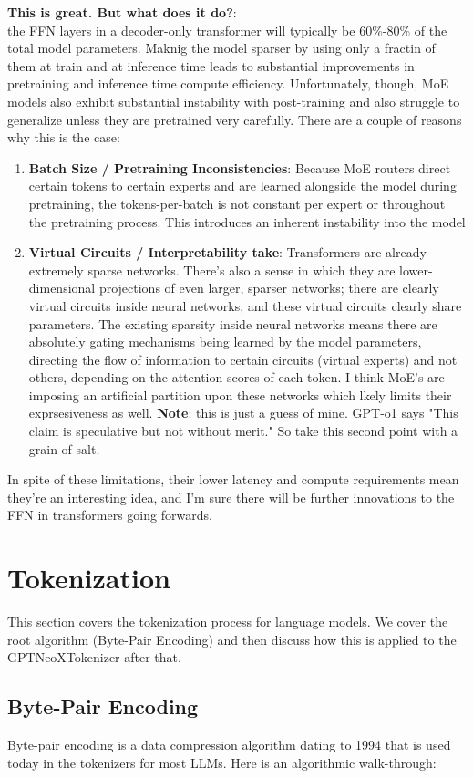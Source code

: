 \documentclass[12pt]{article}
\begin{document}
\textbf{This is great. But what does it do?}:\\
the FFN layers in a decoder-only transformer will typically be 60\%-80\% of the total model parameters. Maknig the model sparser by using only a fractin of them at train and at inference time leads to substantial improvements in pretraining and inference time compute efficiency. Unfortunately, though, MoE models also exhibit substantial instability with post-training and also struggle to generalize unless they are pretrained very carefully. There are a couple of reasons why this is the case: 
\begin{enumerate}
\item \textbf{Batch Size / Pretraining Inconsistencies}: Because MoE routers direct certain tokens to certain experts and are learned alongside the model during pretraining, the tokens-per-batch is not constant per expert or throughout the pretraining process. This introduces an inherent instability into the model
\item \textbf{Virtual Circuits / Interpretability take}: Transformers are already extremely sparse networks. There's also a sense in which they are lower-dimensional projections of even larger, sparser networks; there are clearly virtual circuits inside neural networks, and these virtual circuits clearly share parameters. The existing sparsity inside neural networks means there are absolutely gating mechanisms being learned by the model parameters, directing the flow of information to certain circuits (virtual experts) and not others, depending on the attention scores of each token. I think MoE's are imposing an artificial partition upon these networks which lkely limits their exprsesiveness as well. \textbf{Note}: this is just a guess of mine. GPT-o1 says "This claim is speculative but not without merit." So take this second point with a grain of salt.
\end{enumerate}
In spite of these limitations, their lower latency and compute requirements mean they're an interesting idea, and I'm sure there will be further innovations to the FFN in transformers going forwards.

\section{Tokenization}
This section covers the tokenization process for language models. We cover the root algorithm (Byte-Pair Encoding) and then discuss how this is applied to the GPTNeoXTokenizer after that. 
\subsection{Byte-Pair Encoding}
Byte-pair encoding is a data compression algorithm dating to 1994 that is used today in the tokenizers for most LLMs. Here is an algorithmic walk-through:
\end{document}
